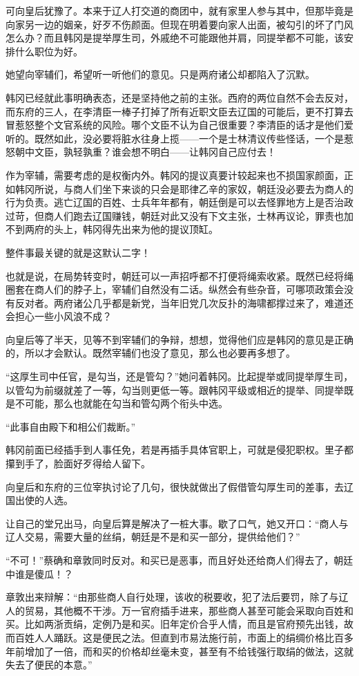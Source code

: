可向皇后犹豫了。本来于辽人打交道的商团中，就有家里人参与其中，但那毕竟是向家另一边的姻亲，好歹不伤颜面。但现在明着要向家人出面，被勾引的坏了门风怎么办？而且韩冈是提举厚生司，外戚绝不可能跟他并肩，同提举都不可能，该安排什么职位为好。

她望向宰辅们，希望听一听他们的意见。只是两府诸公却都陷入了沉默。

韩冈已经就此事明确表态，还是坚持他之前的主张。西府的两位自然不会去反对，而东府的三人，在李清臣一棒子打掉了所有近职文臣去辽国的可能后，更不打算去冒惹怒整个文官系统的风险。哪个文臣不认为自己很重要？李清臣的话才是他们爱听的。既然如此，没必要将脏水往身上揽——一个是士林清议传些怪话，一个是惹怒朝中文臣，孰轻孰重？谁会想不明白——让韩冈自己应付去！

作为宰辅，需要考虑的是权衡内外。韩冈的提议真要计较起来也不损国家颜面，正如韩冈所说，与商人们坐下来谈的只会是耶律乙辛的家奴，朝廷没必要去为商人的行为负责。逃亡辽国的百姓、士兵年年都有，朝廷倒是可以去怪罪地方上是否治政过苛，但商人们跑去辽国赚钱，朝廷对此又没有下文主张，士林再议论，罪责也加不到两府的头上，韩冈得先出来为他的提议顶缸。

整件事最关键的就是这默认二字！

也就是说，在局势转变时，朝廷可以一声招呼都不打便将绳索收紧。既然已经将绳圈套在商人们的脖子上，宰辅们自然没有二话。纵然会有些杂音，可哪项政策会没有反对者。两府诸公几乎都是新党，当年旧党几次反扑的海啸都撑过来了，难道还会担心一些小风浪不成？

向皇后等了半天，见等不到宰辅们的争辩，想想，觉得他们应是韩冈的意见是正确的，所以才会默认。既然宰辅们也没了意见，那么也必要再多想了。

“这厚生司中任官，是勾当，还是管勾？”她问着韩冈。比起提举或同提举厚生司，以管勾为前缀就差了一等，勾当则更低一等。跟韩冈平级或相近的提举、同提举既是不可能，那么也就能在勾当和管勾两个衔头中选。

“此事自由殿下和相公们裁断。”

韩冈前面已经插手到人事任免，若是再插手具体官职上，可就是侵犯职权。里子都攥到手了，脸面好歹得给人留下。

向皇后和东府的三位宰执讨论了几句，很快就做出了假借管勾厚生司的差事，去辽国出使的人选。

让自己的堂兄出马，向皇后算是解决了一桩大事。歇了口气，她又开口：“商人与辽人交易，需要大量的丝绢，朝廷是不是和买一部分，提供给他们？”

“不可！”蔡确和章敦同时反对。和买已是恶事，而且好处还给商人们得去了，朝廷中谁是傻瓜！？

章敦出来辩解：“由那些商人自行处理，该收的税要收，犯了法后要罚，除了与辽人的贸易，其他概不干涉。万一官府插手进来，那些商人甚至可能会采取向百姓和买。比如两浙贡绢，定例乃是和买。旧年定价合乎人情，而且是官府预先出钱，故而百姓人人踊跃。这是便民之法。但直到市易法施行前，市面上的绢绸价格比百多年前增加了一倍，而和买的价格却丝毫未变，甚至有不给钱强行取绢的做法，这就失去了便民的本意。”

